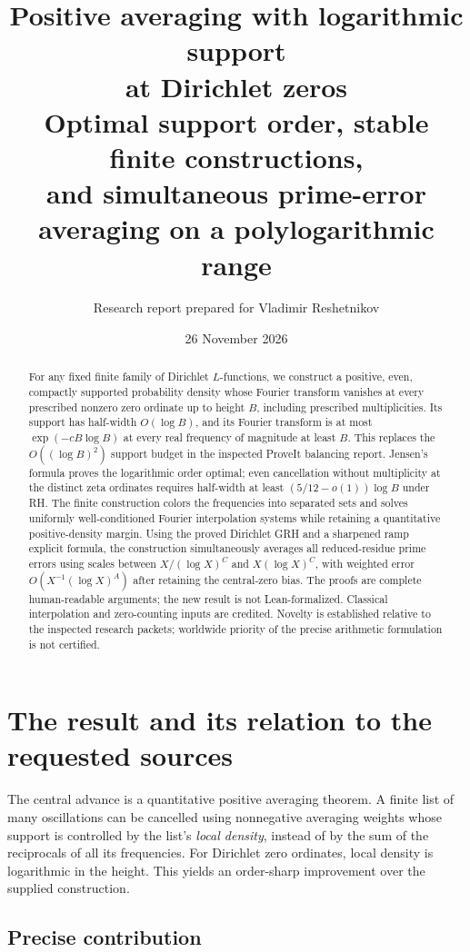 \documentclass[11pt]{article}
\title{\textcolor{ink}{Positive averaging with logarithmic support\\at Dirichlet zeros}\\[5pt]
\large Optimal support order, stable finite constructions,\\and simultaneous prime-error averaging on a polylogarithmic range}
\author{Research report prepared for Vladimir Reshetnikov}
\date{26 November 2026}
\theoremstyle{remark}\newtheorem{remark}[theorem]{Remark}
\begin{document}
\maketitle
\begin{abstract}
For any fixed finite family of Dirichlet $L$-functions, we construct a
positive, even, compactly supported probability density whose Fourier
transform vanishes at every prescribed nonzero zero ordinate up to height
$B$, including prescribed multiplicities. Its support has half-width
$O(\log B)$, and its Fourier transform is at most
$\exp(-cB\log B)$ at every real frequency of magnitude at least $B$.
This replaces the $O((\log B)^2)$ support budget in the inspected ProveIt
balancing report. Jensen's formula proves the logarithmic order optimal;
even cancellation without multiplicity at the distinct zeta ordinates
requires half-width at least $(5/12-o(1))\log B$ under RH.
The finite construction colors the frequencies into separated sets and
solves uniformly well-conditioned Fourier interpolation systems while
retaining a quantitative positive-density margin. Using the proved
Dirichlet GRH and a sharpened ramp explicit formula, the construction
simultaneously averages all reduced-residue prime errors using scales
between $X/(\log X)^C$ and $X(\log X)^C$, with weighted error
$O(X^{-1}(\log X)^A)$ after retaining the central-zero bias.
The proofs are complete human-readable arguments; the new result is not
Lean-formalized. Classical interpolation and zero-counting inputs are
credited. Novelty is established relative to the inspected research
packets; worldwide priority of the precise arithmetic formulation is
not certified.
\end{abstract}

\section{The result and its relation to the requested sources}

The central advance is a quantitative positive averaging theorem. A finite
list of many oscillations can be cancelled using nonnegative averaging
weights whose support is controlled by the list's \emph{local density},
instead of by the sum of the reciprocals of all its frequencies. For
Dirichlet zero ordinates, local density is logarithmic in the height.
This yields an order-sharp improvement over the supplied construction.

\subsection{Precise contribution}
\end{document}
